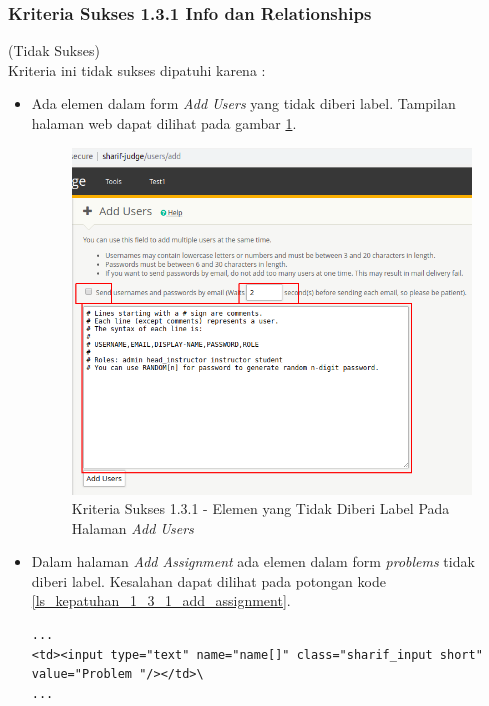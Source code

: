 \documentclass[a4paper,twoside]{article}
\begin{document}
\begin{enumerate}
		\subsubsection*{Kriteria Sukses 1.3.1 Info dan Relationships}
		\label{subsubsec:kepatuhan_kriteria_1.3.1}
		(Tidak Sukses) \\
		Kriteria ini tidak sukses dipatuhi karena :
		\begin{itemize}
			\item Ada elemen dalam form \textit{Add Users} yang tidak diberi label. Tampilan halaman web dapat dilihat pada gambar \ref{fig:kepatuhan_1_3_1_add_user}.
			\begin{figure}[H]
				\centering  
				\includegraphics[scale=0.3]{kepatuhan_1_3_1_add_user}  
				\caption[Kriteria Sukses 1.3.1 - Elemen yang Tidak Diberi Label Pada Halaman \textit{Add Users}]{Kriteria Sukses 1.3.1 - Elemen yang Tidak Diberi Label Pada Halaman \textit{Add Users}} 
				\label{fig:kepatuhan_1_3_1_add_user} 
			\end{figure}
			\item Dalam halaman \textit{Add Assignment} ada elemen dalam form \textit{problems} tidak diberi label. Kesalahan dapat dilihat pada potongan kode \ref{ls_kepatuhan_1_3_1_add_assignment}.
			\begin{lstlisting}[basicstyle=\ttfamily, frame=single,
			columns=fullflexible, keepspaces=true, breaklines=true, label=ls_kepatuhan_1_3_1_add_assignment, caption=Kriteria Sukses 1.3.1 - Elemen Dalam Form yang Tidak Diberi Label]
...
<td><input type="text" name="name[]" class="sharif_input short" value="Problem "/></td>\
...
			\end{lstlisting}
			

\end{itemize}
\end{enumerate}
\end{document}
